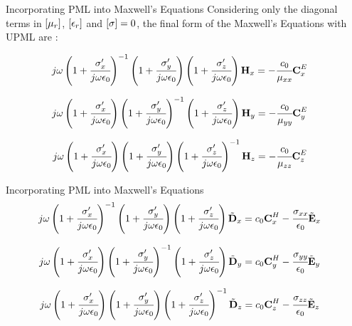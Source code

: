 \documentclass{beamer}
\begin{document}
\begin{frame}{Incorporating PML into Maxwell's Equations}
  Considering only the diagonal terms in $\brackets{\mu_r}$, $\brackets{\epsilon_r}$ and $\brackets{\sigma} = 0$, the final form of the Maxwell's Equations with UPML are \cite{empossible_3d_pml}:

  \begin{align}
    &j\omega\pare{1 + \cfrac{\sigma_x\Prime}{j\omega\epsilon_0}}\inverse \pare{1 + \cfrac{\sigma_y\Prime}{j\omega\epsilon_0}}\pare{1 + \cfrac{\sigma_z\Prime}{j\omega\epsilon_0}} \Hh_x = -\cfrac{c_0}{\mu_{xx}}\CExw
    \label{eq:Hx_upml_freq}
  \end{align}

  \begin{align}
    &j\omega\pare{1 + \cfrac{\sigma_x\Prime}{j\omega\epsilon_0}} \pare{1 + \cfrac{\sigma_y\Prime}{j\omega\epsilon_0}}\inverse\pare{1 + \cfrac{\sigma_z\Prime}{j\omega\epsilon_0}} \Hh_y = -\cfrac{c_0}{\mu_{yy}}\CEyw
    \label{eq:Hy_upml_freq}
  \end{align}

  \begin{align}
    &j\omega\pare{1 + \cfrac{\sigma_x\Prime}{j\omega\epsilon_0}} \pare{1 + \cfrac{\sigma_y\Prime}{j\omega\epsilon_0}}\pare{1 + \cfrac{\sigma_z\Prime}{j\omega\epsilon_0}}\inverse \Hh_z = -\cfrac{c_0}{\mu_{zz}}\CEzw
    \label{eq:Hz_upml_freq}
  \end{align}

\end{frame}

\begin{frame}{Incorporating PML into Maxwell's Equations}
  \begin{align}
    &j\omega\pare{1 + \cfrac{\sigma_x\Prime}{j\omega\epsilon_0}}\inverse \pare{1 + \cfrac{\sigma_y\Prime}{j\omega\epsilon_0}}\pare{1 + \cfrac{\sigma_z\Prime}{j\omega\epsilon_0}} \Dnw_x = c_0\CHxw - \cfrac{\sigma_{xx}}{\epsilon_0}\Enw_x
    \label{eq:Ex_upml_freq}
  \end{align}

  \begin{align}
    &j\omega\pare{1 + \cfrac{\sigma_x\Prime}{j\omega\epsilon_0}} \pare{1 + \cfrac{\sigma_y\Prime}{j\omega\epsilon_0}}\inverse \pare{1 + \cfrac{\sigma_z\Prime}{j\omega\epsilon_0}} \Dnw_y = c_0\CHyw - \cfrac{\sigma_{yy}}{\epsilon_0}\Enw_y
    \label{eq:Ey_upml_freq}
  \end{align}

  \begin{align}
    &j\omega\pare{1 + \cfrac{\sigma_x\Prime}{j\omega\epsilon_0}} \pare{1 + \cfrac{\sigma_y\Prime}{j\omega\epsilon_0}} \pare{1 + \cfrac{\sigma_z\Prime}{j\omega\epsilon_0}}\inverse \Dnw_z = c_0\CHzw - \cfrac{\sigma_{zz}}{\epsilon_0}\Enw_z
    \label{eq:Ez_upml_freq}
  \end{align}

\end{frame}
\end{document}
